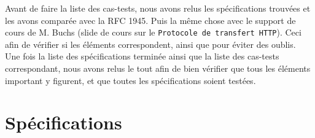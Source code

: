 \documentclass[a4paper, 11pt]{article}
\begin{document}
Avant de faire la liste des cas-tests, nous avons relus les spécifications
trouvées et les avons comparée avec la RFC 1945. Puis la même chose avec le
support de cours de M. Buchs (slide de cours sur le \texttt{Protocole de
transfert HTTP}). Ceci afin de vérifier si les éléments correspondent, ainsi que
pour éviter des oublis. \\

Une fois la liste des spécifications terminée ainsi que la liste des cas-tests
correspondant, nous avons relus le tout afin de bien vérifier que tous les
éléments important y figurent, et que toutes les spécifications soient testées.

\section{Spécifications}
\end{document}

